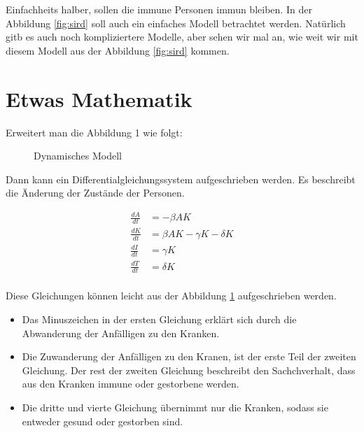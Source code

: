 \documentclass[11pt, a4paper]{article}
\begin{document}
Einfachheits halber, sollen die immune Personen immun bleiben. In der Abbildung
\ref{fig:sird} soll auch ein einfaches Modell betrachtet werden. Natürlich gitb es auch
noch kompliziertere Modelle, aber sehen wir mal an, wie weit wir mit diesem Modell aus der
Abbildung \ref{fig:sird} kommen.

\section{Etwas Mathematik}
Erweitert man die Abbildung 1 wie folgt:
\begin{figure}[h]
\centering
{}
\caption{Dynamisches Modell}
\label{fig:dynModel}
\end{figure}

Dann kann ein Differentialgleichungssystem aufgeschrieben werden. Es beschreibt die
Änderung der Zustände der Personen.

\begin{equation}
    \begin{aligned}
        \frac{dA}{dt} &= -\beta AK                      \\[5pt]
        \frac{dK}{dt} &= \beta AK - \gamma K - \delta K \\[5pt]
        \frac{dI}{dt} &= \gamma K                       \\[5pt]
        \frac{dT}{dt} &= \delta K                       \\[10pt]
    \end{aligned}
    \label{eq:sird}
\end{equation}

Diese Gleichungen können leicht aus der Abbildung \ref{fig:dynModel} aufgeschrieben werden.

\begin{itemize}[itemsep=0pt]
    \item Das Minuszeichen in der ersten Gleichung erklärt sich durch die Abwanderung der
        Anfälligen zu den Kranken.
    \item Die Zuwanderung der Anfälligen zu den Kranen, ist der erste Teil der zweiten Gleichung.
        Der rest der zweiten Gleichung beschreibt den Sachchverhalt, dass aus den Kranken
        immune oder gestorbene werden.
    \item Die dritte und vierte Gleichung übernimmt nur die Kranken, sodass sie entweder
        gesund oder gestorben sind.
\end{itemize}
\end{document}
